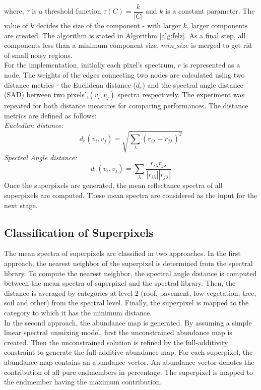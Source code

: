 \documentclass[12pt,twoside]{article}
\theoremstyle{plain}
\theoremstyle{definition}
\theoremstyle{remark}
\newcommand{\forceindent}{\leavevmode{\parindent=2em\indent}}
\begin{document}
where, $\tau$ is a threshold function $\tau(C) = \dfrac{k}{\lvert C\rvert}$ and $k$ is a constant parameter. The value of $k$ decides the size of the component - with larger $k$, larger components are created. The algorithm is stated in Algorithm \ref{alg:felz}.
As a final step, all components less than a minimum component size, $min\_size$ is merged to get rid of small noisy regions.\\
\forceindent For the implementation, initially each pixel's spectrum, $r$ is represented as a node. The weights of the edges connecting two nodes are calculated using two distance metrics - the Euclidean distance ($d_e$) and the spectral angle distance (SAD) between two pixels',$(v_i,v_j)$ spectra respectively. The experiment was repeated for both distance measures for comparing performances. The distance metrics are defined as follows:\\
\forceindent \textit{Eucledian distance:}
\begin{equation}
\label{eq:euc}
d_e(v_i,v_j) = \sqrt{\sum_{\lambda} (r_{i\lambda} - r_{j\lambda})^{2}}
\end{equation}
\forceindent \textit{Spectral Angle distance:}
\begin{equation}
\label{eq:sad}
d_e(v_i,v_j) = \sum_{\lambda} \dfrac{r_{i\lambda}r_{j\lambda}}{|r_{i\lambda}||r_{j\lambda}|}
\end{equation} 
Once the superpixels are generated, the mean reflectance spectra of all superpixels are computed. These mean spectra are considered as the input for the next stage.

\subsection{Classification of Superpixels}
The mean spectra of superpixels are classified in two approaches. In the first approach, the nearest neighbor of the superpixel is determined from the spectral library. To compute the nearest neighbor, the spectral angle distance is computed between the mean spectra of superpixel and the spectral library. Then, the distance is averaged by categories at level 2 (roof, pavement, low vegetation, tree, soil and other) from the spectral level. Finally, the superpixel is mapped to the category to which it has the minimum distance.\\
In the second approach, the abundance map is generated. By assuming a simple linear spectral unmixing model, first the unconstrained abundance map is created. Then the unconstrained solution is refined by the full-additivity constraint to generate the full-additive abundance map. For each superpixel, the abundance map contains an abundance vector. An abundance vector denotes the contribution of all pure endmembers in percentage. The superpixel is mapped to the endmember having the maximum contribution.
\end{document}

